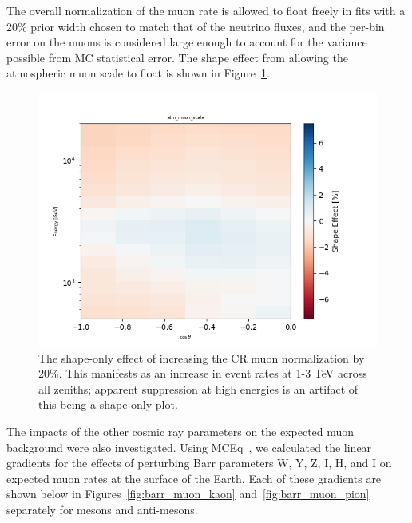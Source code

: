 \documentclass[main.tex]{subfiles}
\begin{document}
The overall normalization of the muon rate is allowed to float freely in fits with a 20\% prior width chosen to match that of the neutrino fluxes, and the per-bin error on the muons is considered large enough to account for the variance possible from MC statistical error.
The shape effect from allowing the atmospheric muon scale to float is shown in Figure~\ref{fig:muon_shape}.

\begin{figure}
    \centering
    \includegraphics[width=0.8\linewidth]{figures/atm_muon_scale.png}
    \caption{The shape-only effect of increasing the CR muon normalization by 20\%. This manifests as an increase in event rates at 1-3 TeV across all zeniths; apparent suppression at high energies is an artifact of this being a shape-only plot.}\label{fig:muon_shape}
\end{figure}

The impacts of the other cosmic ray parameters on the expected muon background were also investigated. 
Using MCEq~\cite{fedynitch2015calculation}, we calculated the linear gradients for the effects of perturbing Barr parameters W, Y, Z, I, H, and I on expected muon rates at the surface of the Earth. 
Each of these gradients are shown below in Figures~\ref{fig:barr_muon_kaon} and~\ref{fig:barr_muon_pion} separately for mesons and anti-mesons.
\end{document}
